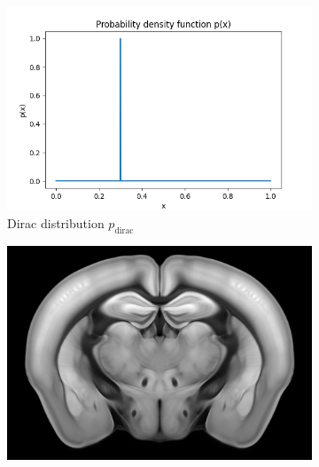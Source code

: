 \documentclass[]{article}
\begin{document}
\begin{figure}
	\begin{subfigure}{0.3\textwidth}
		\centering
		\includegraphics[width=1.1\linewidth]{plotted_figures/constant_density_function.png}
		\caption{Dirac distribution $p_\text{dirac}$}
		\label{fig:dirac_distribution}
	\end{subfigure}
	\begin{subfigure}{0.3\textwidth}
		\centering
		\includegraphics[width=0.95\linewidth]{figures/avgt_coronal.png}
		\caption{}
	\end{subfigure}
	\begin{subfigure}{0.3\textwidth}
		\centering

\end{subfigure}
\end{figure}
\end{document}
